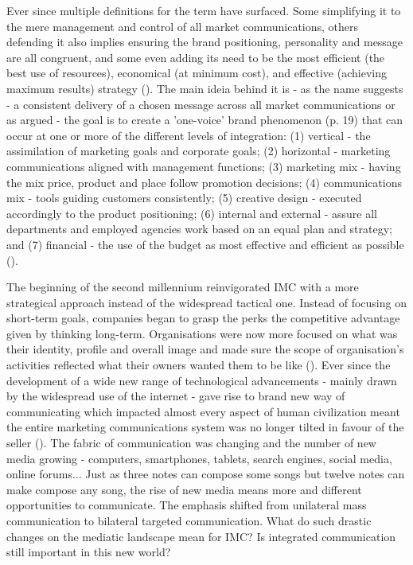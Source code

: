 \documentclass[11pt]{article}
\begin{document}
Ever since multiple definitions for the term have surfaced. Some simplifying it to the mere management and control of all market communications, others defending it also implies ensuring the brand positioning, personality and message are all congruent, and some even adding its need to be the most efficient (the best use of resources), economical (at minimum cost), and effective (achieving maximum results) strategy (\cite{smith}). The main ideia behind it is - as the name suggests - a consistent delivery of a chosen message across all market communications or as  \citeauthor{kitchen} \citeyear{kitchen} argued - the goal is to create a 'one-voice' brand phenomenon (p. 19) that can occur at one or more of the different levels of integration: (1) vertical - the assimilation of marketing goals and corporate goals; (2) horizontal - marketing communications aligned with management functions; (3) marketing mix - having the mix price, product and place follow promotion decisions; (4) communications mix - tools guiding customers consistently; (5) creative design - executed accordingly to the product positioning; (6) internal and external - assure all departments and employed agencies work based on an equal plan and strategy; and (7) financial - the use of the budget as most effective and efficient as possible (\cite{smith}). 

The beginning of the second millennium reinvigorated IMC with a more strategical approach instead of the widespread tactical one. Instead of focusing on short-term goals, companies began to grasp the perks the competitive advantage given by thinking long-term. Organisations were now more focused on what was their identity, profile and overall image and made sure the scope of organisation's activities reflected what their owners wanted them to be like (\cite{holm}). Ever since the development of a wide new range of technological advancements - mainly drawn by the widespread use of the internet -  gave rise to brand new way of communicating which impacted almost every aspect of human civilization meant the entire marketing communications system was no longer tilted in favour of the seller (\cite{kliatchko}). The fabric of communication was changing and the number of new media growing - computers, smartphones, tablets, search engines, social media, online forums...  Just as three notes can compose some songs but twelve notes can make compose any song, the rise of new media means more and different opportunities to communicate. The emphasis shifted from unilateral mass communication to bilateral targeted communication. What do such drastic changes on the mediatic landscape mean for IMC? Is integrated communication still important in this new world?
\end{document}
